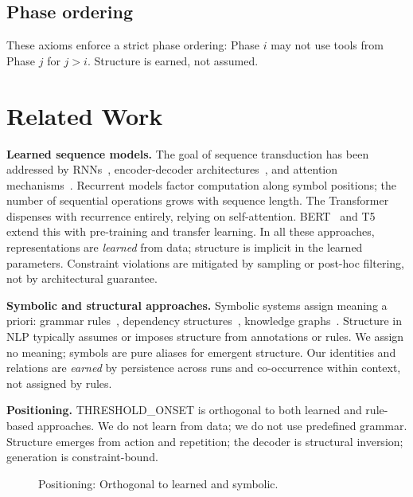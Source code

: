 \documentclass[10pt]{article}
\begin{document}
\subsection{Phase ordering}

These axioms enforce a strict phase ordering: Phase $i$ may not use tools from Phase $j$ for $j > i$. Structure is earned, not assumed.

\section{Related Work}
\label{sec:related}

\textbf{Learned sequence models.}
The goal of sequence transduction has been addressed by RNNs~\cite{hochreiter1997long}, encoder-decoder architectures~\cite{sutskever2014sequence}, and attention mechanisms~\cite{bahdanau2015neural}. Recurrent models factor computation along symbol positions; the number of sequential operations grows with sequence length. The Transformer~\cite{vaswani2017attention} dispenses with recurrence entirely, relying on self-attention. BERT~\cite{devlin2019bert} and T5~\cite{raffel2019t5} extend this with pre-training and transfer learning. In all these approaches, representations are \emph{learned} from data; structure is implicit in the learned parameters. Constraint violations are mitigated by sampling or post-hoc filtering, not by architectural guarantee.

\textbf{Symbolic and structural approaches.}
Symbolic systems assign meaning a priori: grammar rules~\cite{chomsky1957syntactic}, dependency structures~\cite{de2008dependency}, knowledge graphs~\cite{lehmann2015dbpedia}. Structure in NLP typically assumes or imposes structure from annotations or rules. We assign no meaning; symbols are pure aliases for emergent structure. Our identities and relations are \emph{earned} by persistence across runs and co-occurrence within context, not assigned by rules.

\textbf{Positioning.}
THRESHOLD\_ONSET is orthogonal to both learned and rule-based approaches. We do not learn from data; we do not use predefined grammar. Structure emerges from action and repetition; the decoder is structural inversion; generation is constraint-bound.

\begin{figure}[t]
\centering
{}
\caption{Positioning: Orthogonal to learned and symbolic.}
\label{fig:positioning}
\end{figure}
\end{document}
